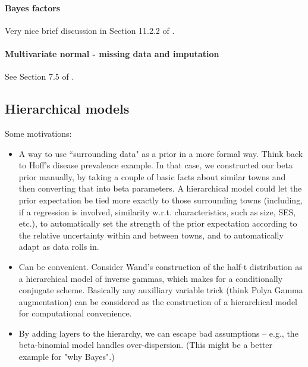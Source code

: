 \documentclass{article} %
\begin{document}
\paragraph{Bayes factors}

Very nice brief discussion in Section 11.2.2 of \cite{davison2003statistical}. 

\paragraph{Multivariate normal - missing data and imputation}

See Section 7.5 of \cite{hoff2009first}.

\subsection{Hierarchical models}

Some motivations:  
\begin{itemize}
\item A way to use ``surrounding data" as a prior in a more formal way.    Think back to Hoff's disease prevalence example.    In that case,  we constructed our beta prior manually,  by taking a couple of basic facts about similar towns and then converting that into beta parameters.    A hierarchical model could let the prior expectation be tied more exactly to those surrounding towns (including, if a regression is involved,  similarity w.r.t.  characteristics,  such as size,  SES,  etc.),  to automatically set the strength of the prior expectation according to the relative uncertainty within and between towns,  and to automatically adapt as data rolls in. 
\item Can be convenient.  Consider Wand's construction of the half-t distribution as a hierarchical model of inverse gammas,  which makes for a conditionally conjugate scheme.  Basically any auxilliary variable trick (think Polya Gamma augmentation) can be considered as the construction of a hierarchical model for computational convenience.  
\item By adding layers to the hierarchy,  we can escape bad assumptions -- e.g.,  the beta-binomial model handles over-dispersion.   (This might be a better example for "why Bayes".)
\end{itemize}


%
\end{document}
